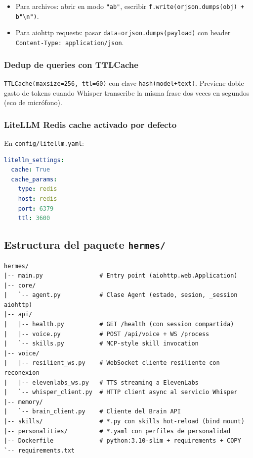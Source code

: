 \documentclass[11pt,a4paper]{article}
\begin{document}
\begin{itemize}[leftmargin=*,itemsep=1pt]
\item Para archivos: abrir en modo \texttt{"ab"}, escribir \texttt{f.write(orjson.dumps(obj) + b"\textbackslash n")}.
\item Para aiohttp requests: pasar \texttt{data=orjson.dumps(payload)} con header \texttt{Content-Type: application/json}.
\end{itemize}

\subsubsection{Dedup de queries con TTLCache}

\texttt{TTLCache(maxsize=256, ttl=60)} con clave \texttt{hash(model+text)}. Previene doble gasto de tokens cuando Whisper transcribe la misma frase dos veces en segundos (eco de micrófono).

\subsubsection{LiteLLM Redis cache activado por defecto}

En \texttt{config/litellm.yaml}:

\begin{lstlisting}[language=yaml]
litellm_settings:
  cache: True
  cache_params:
    type: redis
    host: redis
    port: 6379
    ttl: 3600
\end{lstlisting}

\subsection{Estructura del paquete \texttt{hermes/}}

\begin{lstlisting}[language=bashx]
hermes/
|-- main.py                # Entry point (aiohttp.web.Application)
|-- core/
|   `-- agent.py           # Clase Agent (estado, sesion, _session aiohttp)
|-- api/
|   |-- health.py          # GET /health (con session compartida)
|   |-- voice.py           # POST /api/voice + WS /process
|   `-- skills.py          # MCP-style skill invocation
|-- voice/
|   |-- resilient_ws.py    # WebSocket cliente resiliente con reconexion
|   |-- elevenlabs_ws.py   # TTS streaming a ElevenLabs
|   `-- whisper_client.py  # HTTP client async al servicio Whisper
|-- memory/
|   `-- brain_client.py    # Cliente del Brain API
|-- skills/                # *.py con skills hot-reload (bind mount)
|-- personalities/         # *.yaml con perfiles de personalidad
|-- Dockerfile             # python:3.10-slim + requirements + COPY
`-- requirements.txt
\end{lstlisting}
\end{document}
